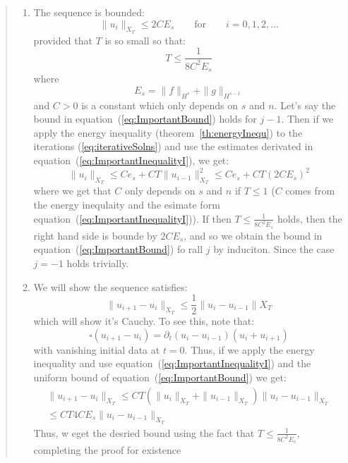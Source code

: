\documentclass{book}
\newenvironment{Proof}[1][]
  {\begin{ProofTcb}[#1]}
  {\end{ProofTcb}}
\renewcommand{\bf}[1]{\textbf{#1}}
\begin{document}
\begin{Proof}
	\begin{quote}
		\begin{enumerate}
			\item[(\bf{Step 1})] The sequence is bounded:
				\begin{equation}\label{eq:ImportantBound}
				  \|u_i\|_{X_T} \le 2CE_s \qquad \text{for} \qquad i=0,1,2,...
				\end{equation}
				provided that $T$ is so small so that:
				\[
					T \le \frac{1}{8C^2E_s}
				\]
				where
				\[
					E_s = \|f\|_{H^s} + \|g\|_{H^{s-1}}
				\]
				and $C > 0$ is a constant which only depends on $s$ and $n$. Let's say the bound in
				equation~(\ref{eq:ImportantBound}) holds for $j-1$. Then if we apply the energy inequality
				(theorem~\ref{th:energyInequ}) to the iterations (\ref{eq:iterativeSolns}) and use the estimates
				derivated in equation~(\ref{eq:ImportantInequalityI}), we get:
				\[
					\|u_i\|_{X_T} \le Ce_s + CT\|u_{i-1}\|_{X_T}^2 \le Ce_s + CT(2CE_s)^2
				\]
				where we get that $C$ only depends on $s$ and $n$ if $T \le 1$ ($C$ comes from the
				energy inequlaity and the esimate form equation~(\ref{eq:ImportantInequalityI})).
				If then $T \le \frac{1}{8C^2E_s}$ holds, then the right hand side is bounde by $2CE_s$,
				and so we obtain the bound in equation~(\ref{eq:ImportantBound}) fo rall
				$j$ by induciton. Since the case $j = -1$ holds trivially.
			\item[\bf{Step 2}] We will show the sequence satisfies:
				\[
					\|u_{i+1} - u_i\|_{X_T} \le \frac{1}{2} \|u_i - u_{i-1}\|X_T
				\]
				which will show it's Cauchy. To see this, note that:
				\[
					\square(u_{i+1} - u_i) =  \partial_t (u_i - u_{i-1})(u_i + u_{i+1})
				\]
				with vanishing initial data at $t = 0$. Thus, if we apply the energy inequality and use
				equation~(\ref{eq:ImportantInequalityI}) and the uniform bound of
				equation~(\ref{eq:ImportantBound}) we get:
				\begin{align*}
					\|u_{i+1} - u_i\|_{X_T} \le CT\left( \|u_i\|_{X_T}
					+ \|u_{i-1}\|_{X_T}\right)\|u_i - u_{i-1}\|_{X_T}\\
					\le CT4CE_s\|u_i - u_{i-1}\|_{X_T}
				\end{align*}
				Thus, w eget the desried bound using the fact that $T \le \frac{1}{8C^2E_s}$,
				completing the proof for existence
		\end{enumerate}
	\end{quote}


\end{Proof}
\end{document}
